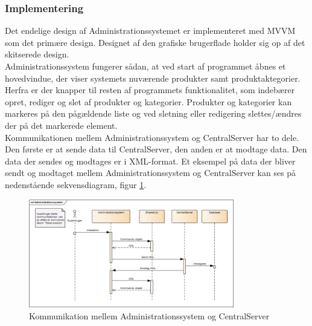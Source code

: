 \subsubsection{Implementering}
Det endelige design af Administrationssystemet er implementeret med MVVM som det primære design. Designet af den grafiske brugerflade holder sig op af det skitserede design.\\
Administrationssystem fungerer sådan, at ved start af programmet åbnes et hovedvindue, der viser systemets nuværende produkter samt produktaktegorier. Herfra er der knapper til resten af programmets funktionalitet, som indebærer opret, rediger og slet af produkter og kategorier. Produkter og kategorier kan markeres på den pågældende liste og ved sletning eller redigering slettes/ændres der på det markerede element.\\

Kommunikationen mellem Administrationssystem og CentralServer har to dele. Den første er at sende data til CentralServer, den anden er at modtage data. Den data der sendes og modtages er i XML-format. Et eksempel på data der bliver sendt og modtaget mellem Administrationssystem og CentralServer kan ses på nedenstående sekvensdiagram, figur \ref{fig:adminsekvens}.

\begin{figure}[H]
	\centering
	\includegraphics[width=0.8\textwidth]{Projektbeskrivelse/DesignOgImplementering/Images/Administrationssystem-sekvensdiagram}
	\caption{Kommunikation mellem Administrationssystem og CentralServer}
	\label{fig:adminsekvens}
\end{figure}

